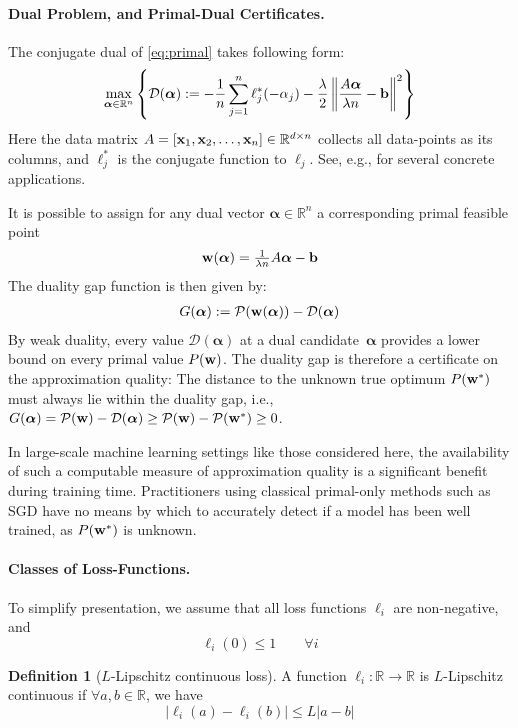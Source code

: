 \documentclass{article}
\newcommand{\eqdef}{:=}
\newcommand{\R}{\mathbb{R}}                      %
\newcommand{\N}{n}                               %
\newcommand{\xv}{ {\bf x}}
\newcommand{\wv}{ {\bf w}}
\newcommand{\alphav}{ {\boldsymbol \alpha}}
\newcommand{\bv}{ {\bf b}}
\newcommand{\0}{ {\bf 0}}
\newcommand{\bP}{\mathcal{P}}
\newcommand{\bD}{\mathcal{D}}
\theoremstyle{plain}
\theoremstyle{definition}
\newtheorem{definition}[theorem]{Definition}
\begin{document}
\paragraph{Dual Problem, and Primal-Dual Certificates.}
The conjugate dual of \eqref{eq:primal} takes following form:\vspace{-2mm}
\begin{equation}
\label{eq:dual}
\max_{\alphav \in \R^\N}
  \left\{
 \bD(\alphav )\eqdef  
 -\frac1n \sum_{j=1}^\N \ell_j^*(- \alpha_j)
 -\frac{\lambda}{2} 
  \left\|\frac{A \alphav}{\lambda\N} - \bf{b}\right\|^2  \right\}
\end{equation}
Here the data matrix $A=[\xv_1, \xv_2, \dots, \xv_n] \in \R^{d\times n}$ collects all data-points as its columns, 
and $\ell_j^*$ is the conjugate function to $\ell_j$. See, e.g., \cite{ShalevShwartz:2013wl} for several concrete applications.

It is possible to assign for any dual vector $\alphav \in \R^n$ 
a corresponding primal feasible point
\begin{equation}
\label{eq:PDMapping}
\wv(\alphav)
 = \tfrac1{\lambda n} A \alphav - \bv
\end{equation}
The duality gap function is then given by:
\begin{align}
\label{eq:gap}
G(\alphav)
 := \bP(\wv(\alphav))-\bD(\alphav)
\end{align}
By weak duality, every value $\bD(\alphav)$ at a dual candidate~$\alphav$ provides a lower bound on every primal value $P(\wv)$. The duality gap is therefore a certificate on the approximation quality: The distance to the unknown true optimum $P(\wv^*)$ must always lie within the duality gap, i.e., $G(\alphav) = \bP(\wv)-\bD(\alphav) \ge \bP(\wv) - \bP(\wv^*) \ge 0$.

In large-scale machine learning settings like those considered here, the availability of such a computable measure of approximation quality is a significant benefit during training time. Practitioners using classical primal-only methods such as SGD have no means by which to accurately detect if a model has been well trained, as $P(\wv^*)$ is unknown.
 
 
\paragraph{Classes of Loss-Functions.}
To simplify presentation, we assume %
that all loss functions $\ell_i$ are non-negative, and  \vspace{-2mm}
\begin{equation}
 \ell_i(0)\leq 1  \qquad \forall i
\label{eq:afswfevfwaefa}
\end{equation}
\begin{definition}[$L$-Lipschitz continuous loss]
A function $\ell_i: \R \to \R$ is $L$-Lipschitz continuous if $\forall a,b \in \R$, we have
\begin{equation}
 | \ell_i(a) - \ell_i(b) | \leq L |a-b|
\end{equation}
\end{definition}
\end{document}
